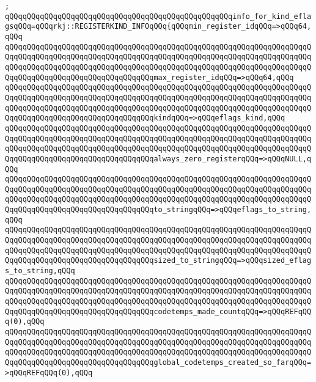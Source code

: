 \verb|;|\newline
\verb|qQQqqQQqqQQqqQQqqQQqqQQqqQQqqQQqqQQqqQQqqQQqqQQqqQQqinfo_for_kind_eflagsqQQq=qQQqrkj::REGISTERKIND_INFOqQQq{qQQqmin_register_idqQQq=>qQQq64,qQQq|\newline
\verb|qQQqqQQqqQQqqQQqqQQqqQQqqQQqqQQqqQQqqQQqqQQqqQQqqQQqqQQqqQQqqQQqqQQqqQQqqQQqqQQqqQQqqQQqqQQqqQQqqQQqqQQqqQQqqQQqqQQqqQQqqQQqqQQqqQQqqQQqqQQqqQQqqQQqqQQqqQQqqQQqqQQqqQQqqQQqqQQqqQQqqQQqqQQqqQQqqQQqqQQqqQQqqQQqqQQqqQQqqQQqqQQqqQQqqQQqqQQqqQQqqQQqmax_register_idqQQq=>qQQq64,qQQq|\newline
\verb|qQQqqQQqqQQqqQQqqQQqqQQqqQQqqQQqqQQqqQQqqQQqqQQqqQQqqQQqqQQqqQQqqQQqqQQqqQQqqQQqqQQqqQQqqQQqqQQqqQQqqQQqqQQqqQQqqQQqqQQqqQQqqQQqqQQqqQQqqQQqqQQqqQQqqQQqqQQqqQQqqQQqqQQqqQQqqQQqqQQqqQQqqQQqqQQqqQQqqQQqqQQqqQQqqQQqqQQqqQQqqQQqqQQqqQQqqQQqqQQqqQQqkindqQQq=>qQQqeflags_kind,qQQq|\newline
\verb|qQQqqQQqqQQqqQQqqQQqqQQqqQQqqQQqqQQqqQQqqQQqqQQqqQQqqQQqqQQqqQQqqQQqqQQqqQQqqQQqqQQqqQQqqQQqqQQqqQQqqQQqqQQqqQQqqQQqqQQqqQQqqQQqqQQqqQQqqQQqqQQqqQQqqQQqqQQqqQQqqQQqqQQqqQQqqQQqqQQqqQQqqQQqqQQqqQQqqQQqqQQqqQQqqQQqqQQqqQQqqQQqqQQqqQQqqQQqqQQqqQQqalways_zero_registerqQQq=>qQQqNULL,qQQq|\newline
\verb|qQQqqQQqqQQqqQQqqQQqqQQqqQQqqQQqqQQqqQQqqQQqqQQqqQQqqQQqqQQqqQQqqQQqqQQqqQQqqQQqqQQqqQQqqQQqqQQqqQQqqQQqqQQqqQQqqQQqqQQqqQQqqQQqqQQqqQQqqQQqqQQqqQQqqQQqqQQqqQQqqQQqqQQqqQQqqQQqqQQqqQQqqQQqqQQqqQQqqQQqqQQqqQQqqQQqqQQqqQQqqQQqqQQqqQQqqQQqqQQqqQQqto_stringqQQq=>qQQqeflags_to_string,qQQq|\newline
\verb|qQQqqQQqqQQqqQQqqQQqqQQqqQQqqQQqqQQqqQQqqQQqqQQqqQQqqQQqqQQqqQQqqQQqqQQqqQQqqQQqqQQqqQQqqQQqqQQqqQQqqQQqqQQqqQQqqQQqqQQqqQQqqQQqqQQqqQQqqQQqqQQqqQQqqQQqqQQqqQQqqQQqqQQqqQQqqQQqqQQqqQQqqQQqqQQqqQQqqQQqqQQqqQQqqQQqqQQqqQQqqQQqqQQqqQQqqQQqqQQqqQQqsized_to_stringqQQq=>qQQqsized_eflags_to_string,qQQq|\newline
\verb|qQQqqQQqqQQqqQQqqQQqqQQqqQQqqQQqqQQqqQQqqQQqqQQqqQQqqQQqqQQqqQQqqQQqqQQqqQQqqQQqqQQqqQQqqQQqqQQqqQQqqQQqqQQqqQQqqQQqqQQqqQQqqQQqqQQqqQQqqQQqqQQqqQQqqQQqqQQqqQQqqQQqqQQqqQQqqQQqqQQqqQQqqQQqqQQqqQQqqQQqqQQqqQQqqQQqqQQqqQQqqQQqqQQqqQQqqQQqqQQqqQQqcodetemps_made_countqQQq=>qQQqREFqQQq(0),qQQq|\newline
\verb|qQQqqQQqqQQqqQQqqQQqqQQqqQQqqQQqqQQqqQQqqQQqqQQqqQQqqQQqqQQqqQQqqQQqqQQqqQQqqQQqqQQqqQQqqQQqqQQqqQQqqQQqqQQqqQQqqQQqqQQqqQQqqQQqqQQqqQQqqQQqqQQqqQQqqQQqqQQqqQQqqQQqqQQqqQQqqQQqqQQqqQQqqQQqqQQqqQQqqQQqqQQqqQQqqQQqqQQqqQQqqQQqqQQqqQQqqQQqqQQqqQQqglobal_codetemps_created_so_farqQQq=>qQQqREFqQQq(0),qQQq|\newline

